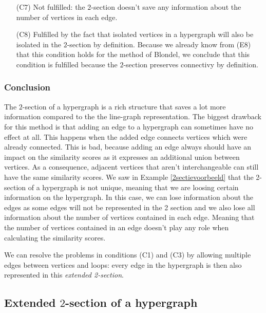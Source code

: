 \documentclass[a4paper,11pt]{report}
\begin{document}
\begin{itemize}
  
     
     \item [(C7)] Not fulfilled: the $2$-section doesn't save any information 
     about the number of vertices in each edge. 
  \item[(C8)] Fulfilled by the fact that isolated vertices in a hypergraph will 
  also be isolated in the $2$-section by definition. Because we already know from (E8) that this condition
  holds for the method of Blondel, we conclude that 
  this condition is fulfilled because the $2$-section preserves connectivy by 
  definition.
  \end{itemize}  

\subsubsection{Conclusion}
The $2$-section of a hypergraph is a rich structure that 
saves a lot more information compared to the the line-graph representation. The biggest drawback for this method is that 
adding an edge to a hypergraph can sometimes have no effect at all. This happens when 
the added edge connects vertices which were already connected. This is bad, because adding an edge always should have an impact on 
  the similarity scores as it expresses an additional union between vertices. As a consequence, adjacent vertices that aren't interchangeable
  can still have the same similarity scores. We saw in Example \ref{2sectievoorbeeld} that
  the 2-section of a hypergraph is not unique, meaning that we are loosing certain
  information on the hypergraph. In this case, we can lose information about 
  the edges as some edges will not be represented in the 2 section and we also lose 
  all information about 
  the number of vertices contained in each edge. Meaning that the number of vertices
  contained in an edge doesn't play any role when calculating the similarity scores. 
  
 We can resolve the problems in conditions (C1) and (C3) by allowing multiple edges
  between vertices and loops: every edge in the hypergraph is then also represented in this \emph{extended 2-section}.
  
  \subsection{Extended $2$-section of a hypergraph}
\end{document}

